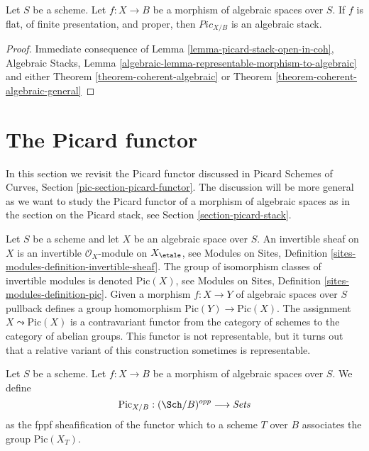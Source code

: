\begin{proposition}
\label{proposition-pic}
Let $S$ be a scheme. Let $f : X \to B$ be a morphism of algebraic
spaces over $S$. If $f$ is flat, of finite presentation, and proper, then
$\textit{Pic}_{X/B}$ is an algebraic stack.
\end{proposition}

\begin{proof}
Immediate consequence of
Lemma \ref{lemma-picard-stack-open-in-coh},
Algebraic Stacks, Lemma
\ref{algebraic-lemma-representable-morphism-to-algebraic}
and either
Theorem \ref{theorem-coherent-algebraic}
or
Theorem \ref{theorem-coherent-algebraic-general}
\end{proof}








\section{The Picard functor}
\label{section-picard-functor}

\noindent
In this section we revisit the Picard functor discussed in
Picard Schemes of Curves, Section \ref{pic-section-picard-functor}.
The discussion will be more general as we want to study
the Picard functor of a morphism of algebraic spaces as in
the section on the Picard stack, see Section \ref{section-picard-stack}.

\medskip\noindent
Let $S$ be a scheme and let $X$ be an algebraic space over $S$.
An invertible sheaf on $X$ is an invertible $\mathcal{O}_X$-module
on $X_\etale$, see
Modules on Sites, Definition \ref{sites-modules-definition-invertible-sheaf}.
The group of isomorphism classes of invertible modules is denoted
$\text{Pic}(X)$, see
Modules on Sites, Definition \ref{sites-modules-definition-pic}.
Given a morphism $f : X \to Y$ of algebraic spaces over $S$
pullback defines a group homomorphism $\text{Pic}(Y) \to \text{Pic}(X)$.
The assignment
$X \leadsto \text{Pic}(X)$ is a contravariant functor from the category
of schemes to the category of abelian groups. This functor is not
representable, but it turns out that a relative variant of this
construction sometimes is representable.

\begin{situation}
\label{situation-pic}
Let $S$ be a scheme.
Let $f : X \to B$ be a morphism of algebraic spaces over $S$.
We define
$$
\text{Pic}_{X/B} : (\Sch/B)^{opp} \longrightarrow \textit{Sets}
$$
as the fppf sheafification of the functor which to a scheme $T$
over $B$ associates the group $\text{Pic}(X_T)$.
\end{situation}

